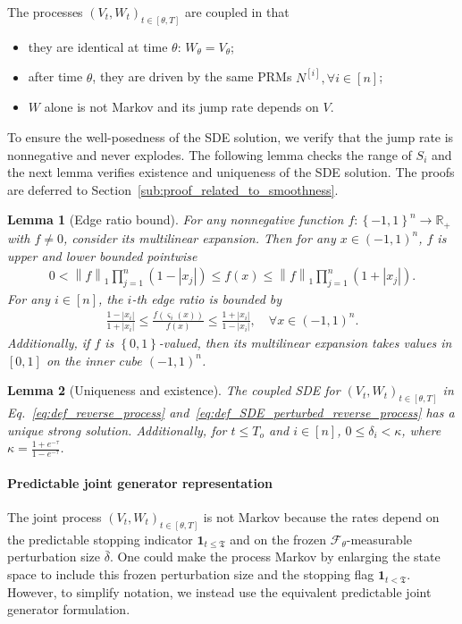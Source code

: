 \documentclass[11pt]{article}
\newcommand{\flip}{\varsigma}
\newcommand{\btau}{\kappa}
\newcommand{\bdelta}{\bar{\delta}}
\newcommand{\stopT}{{\boldsymbol{\mathfrak{T}}}}
\newcommand{\sF}{\mathscr{F}}
\newcommand{\uV}{V}
\newcommand{\uW}{W}
\newcommand{\To}{{T_o}}
\newcommand{\tagi}{{[i]}}
\theoremstyle{named}
\theoremstyle{plain}
\newtheorem{lemma}{Lemma}
\newcommand{\real}{\ensuremath{\mathbb{R}}}
\newcommand{\braces}[1]{\left\{ #1 \right \}}
\newcommand{\abss}[1]{\left| #1 \right |}
\newcommand{\vecnorm}[2]{\left\| #1\right\|_{#2}}
\begin{document}
The processes $(\uV_t, \uW_t)_{t \in [\theta, T]}$ are coupled in that 
\begin{itemize}
  \item they are identical at time $\theta$: $\uW_\theta = \uV_\theta$;
  \item after time $\theta$, they are driven by the same PRMs $N^\tagi, \forall i \in [n]$;
  \item $\uW$ alone is not Markov and its jump rate depends on $\uV$. 
\end{itemize}
To ensure the well-posedness of the SDE solution, we verify that the jump rate is nonnegative and never explodes. The following lemma checks the range of $S_i$ and the next lemma verifies existence and uniqueness of the SDE solution. The proofs are deferred to Section~\ref{sub:proof_related_to_smoothness}. 

\begin{lemma}[Edge ratio bound]
  \label{lem:edge_ratio}
  For any nonnegative function $f: \braces{-1, 1}^n \to \real_+$ with $f \neq 0$, consider its multilinear expansion. Then for any $x\in (-1,1)^n$, $f$ is upper and lower bounded pointwise
  \begin{align*}
    0 < \vecnorm{f}{1} \prod_{j=1}^n (1-\abss{x_j}) \leq f(x) \leq \vecnorm{f}{1} \prod_{j=1}^n (1+\abss{x_j}).
  \end{align*}
  For any $i\in [n]$, the $i$-th edge ratio is bounded by
  \begin{align*}
    \frac{1-\abss{x_i}}{1+\abss{x_i}} \leq \frac{f(\flip_i(x))}{f(x)} \leq \frac{1+\abss{x_i}}{1-\abss{x_i}}, \quad \forall x \in (-1, 1)^n.
  \end{align*}
  Additionally, if $f$ is $\braces{0,1}$-valued, then its multilinear expansion takes values in $[0,1]$ on the inner cube $(-1,1)^n$.
\end{lemma}
\begin{lemma} [Uniqueness and existence]
  \label{lem:uniqueness_existence_SDE_sol}
  The coupled SDE for $(\uV_t, \uW_t)_{t \in [\theta, T]}$ in Eq.~\eqref{eq:def_reverse_process} and~\eqref{eq:def_SDE_perturbed_reverse_process} has a unique strong solution. Additionally, for $t \leq \To$ and $i \in [n]$, $0 \leq \delta_i < \btau$, where $\btau = \frac{1+e^{-\tau}}{1-e^{-\tau}}$. 
\end{lemma}


\paragraph{Predictable joint generator representation} The joint process $(\uV_t, \uW_t)_{t \in [\theta, T]}$ is not Markov because the rates depend on the predictable stopping indicator $\mathbf 1_{t\leq\stopT}$ and on the frozen
$\sF_\theta$-measurable perturbation size $\bdelta$. One could make
the process Markov by enlarging the state space to include this
frozen perturbation size and the stopping flag $\mathbf{1}_{t < \stopT}$. However, to simplify notation, we instead use the equivalent
predictable joint generator formulation.
\end{document}

